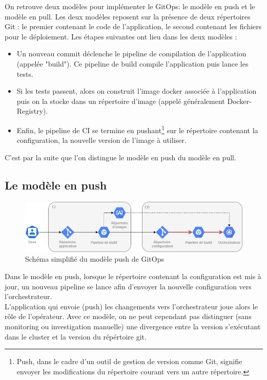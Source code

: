 \documentclass[11pt,fleqn]{book} %
\begin{document}
On retrouve deux modèles pour implémenter le GitOps: le modèle en push et le modèle en pull. Les deux modèles reposent sur la présence de deux répertoires Git : le premier contenant le code de l'application, le second contenant les fichiers pour le déploiement. Les étapes suivantes ont lieu dans les deux modèles : 
\begin{itemize}
     \item Un nouveau commit déclenche le pipeline de compilation de l'application (appelée "build"). Ce pipeline de build compile l'application puis lance les tests.
    \item Si les tests passent, alors on construit l'image docker associée à l'application puis on la  stocke dans un répertoire d'image (appelé généralement Docker-Registry).
    \item Enfin, le pipeline de CI se termine en pushant\footnote{Push, dans le cadre d'un outil de gestion de version comme Git, signifie envoyer les modifications du répertoire courant vers un autre répertoire.} sur le répertoire contenant la configuration, la nouvelle version de l'image à utiliser.
\end{itemize}
C'est par la suite que l'on distingue le modèle en push du modèle en pull.

\subsection{Le modèle en push}
\begin{figure}[H]
\renewcommand{\figurename}{Schéma}
\hspace{-1cm}
\includegraphics[scale=0.6]{Pictures/CI-CD/push-model.png}
\captionsetup{margin=1.5cm,format=hang,justification=justified}
\caption[]{Schéma simplifié du modèle push de GitOps \newline}
\end{figure}

Dans le modèle en push, lorsque le répertoire contenant la configuration est mis à jour, un nouveau pipeline se lance afin d'envoyer la nouvelle configuration vers l'orchestrateur.\\

L'application qui envoie (push) les changements vers l'orchestrateur joue alors le rôle de l'opérateur. Avec ce modèle, on ne peut cependant pas distinguer (sans monitoring ou investigation manuelle) une divergence entre la version s'exécutant dans le cluster et la version du répértoire git. 
\end{document}

